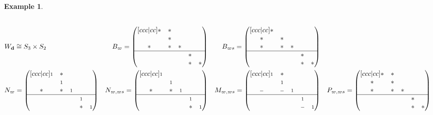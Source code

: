\documentclass[reqno,11pt]{book}
\numberwithin{equation}{section}
\theoremstyle{plain}
\newtheorem{eg}[theorem]{Example}
\theoremstyle{plain}
\numberwithin{equation}{section}
\theoremstyle{remark}
\newcommand{\dimvec}[1]{\mathbf{#1}}
\newcommand{\ww}{\varpi}
\begin{document}
\begin{eg}
\begin{equation*}
\begin{aligned}
  \\
&W_{\dimvec{d}}\cong S_3 \times S_2&
  B_{\ww}=
   \begin{pmatrix}[ccc|cc]
  * & * &  &  &  \\
   & * &  &  &  \\
  * & * & * &  &  \\
     \hline
   &  &  & * &  \\
   &  &  & * & * \\
  \end{pmatrix}&&
  B_{\ww s}=
     \begin{pmatrix}[ccc|cc]
  * &  &  &  &  \\
  * & * &  &  &  \\
  * & * & * &  &  \\
     \hline
   &  &  & * &  \\
   &  &  & * & * \\
    \end{pmatrix}&&
  \\
   &N_{\ww}=
    \begin{pmatrix}[ccc|cc]
   \scriptstyle 1 & * &  &  &  \\
    & \scriptstyle 1 &  &  &  \\
   * & * & \scriptstyle 1 &  &  \\
      \hline
    &  &  & \scriptstyle 1 &  \\
    &  &  & * & \scriptstyle 1 \\
   \end{pmatrix}&
   N_{\ww,\ww s}=
      \begin{pmatrix}[ccc|cc]
   \scriptstyle 1 &  &  &  &  \\
    & \scriptstyle 1 &  &  &  \\
   * & * & \scriptstyle 1 &  &  \\
      \hline
    &  &  & \scriptstyle 1 &  \\
    &  &  & * & \scriptstyle 1 \\
     \end{pmatrix}&& 
   M_{\ww,\ww s}=
      \begin{pmatrix}[ccc|cc]
   \scriptstyle 1 & * &  &  &  \\
    & \scriptstyle 1 &  &  &  \\
   \scriptstyle- & \scriptstyle- & \scriptstyle 1 &  &  \\
      \hline
    &  &  & \scriptstyle 1 &  \\
    &  &  & \scriptstyle- & \scriptstyle 1 \\
     \end{pmatrix}&& 
   P_{\ww,\ww s}=
      \begin{pmatrix}[ccc|cc]
   * & * &  &  &  \\
   * & * &  &  &  \\
   * & * & * &  &  \\
   \hline
    &  &  & * &  \\
    &  &  & * & * \\
     \end{pmatrix}
\end{aligned}
\end{equation*}





\end{eg}
\end{document}
